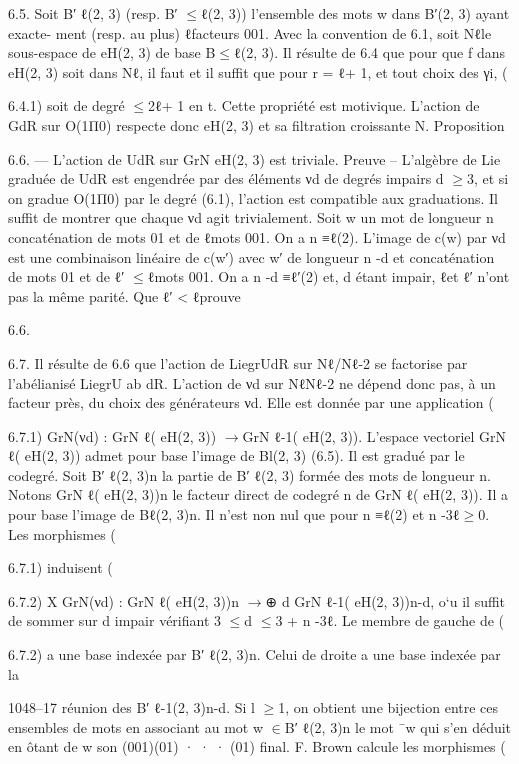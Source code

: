 \documentclass[11pt]{article}
\begin{document}
6.5. Soit B′ ℓ(2, 3) (resp. B′ \(\le\)ℓ(2, 3)) l’ensemble des mots w dans B′(2, 3) ayant exacte- ment (resp. au plus) ℓfacteurs 001. Avec la convention de 6.1, soit Nℓle sous-espace de eH(2, 3) de base B\(\le\)ℓ(2, 3). Il résulte de 6.4 que pour que f dans eH(2, 3) soit dans Nℓ, il faut et il suffit que pour r = ℓ+ 1, et tout choix des γi, (

6.4.1) soit de degré \(\le\)2ℓ+ 1 en t. Cette propriété est motivique. L’action de GdR sur O(1Π0) respecte donc eH(2, 3) et sa filtration croissante N. Proposition 

6.6. --- L’action de UdR sur GrN eH(2, 3) est triviale. Preuve -- L’algèbre de Lie graduée de UdR est engendrée par des éléments νd de degrés impairs d \(\ge\)3, et si on gradue O(1Π0) par le degré (6.1), l’action est compatible aux graduations. Il suffit de montrer que chaque νd agit trivialement. Soit w un mot de longueur n concaténation de mots 01 et de ℓmots 001. On a n ≡ℓ(2). L’image de c(w) par νd est une combinaison linéaire de c(w′) avec w′ de longueur n -d et concaténation de mots 01 et de ℓ′ \(\le\)ℓmots 001. On a n -d ≡ℓ′(2) et, d étant impair, ℓet ℓ′ n’ont pas la même parité. Que ℓ′ < ℓprouve 

6.6. 

6.7. Il résulte de 6.6 que l’action de LiegrUdR sur Nℓ/Nℓ-2 se factorise par l’abélianisé LiegrU ab dR. L’action de νd sur NℓNℓ-2 ne dépend donc pas, à un facteur près, du choix des générateurs νd. Elle est donnée par une application (

6.7.1) GrN(νd) : GrN ℓ( eH(2, 3)) \(\to\)GrN ℓ-1( eH(2, 3)). L’espace vectoriel GrN ℓ( eH(2, 3)) admet pour base l’image de Bl(2, 3) (6.5). Il est gradué par le codegré. Soit B′ ℓ(2, 3)n la partie de B′ ℓ(2, 3) formée des mots de longueur n. Notons GrN ℓ( eH(2, 3))n le facteur direct de codegré n de GrN ℓ( eH(2, 3)). Il a pour base l’image de Bℓ(2, 3)n. Il n’est non nul que pour n ≡ℓ(2) et n -3ℓ\(\ge\)0. Les morphismes (

6.7.1) induisent (

6.7.2) X GrN(νd) : GrN ℓ( eH(2, 3))n \(\to\)⊕ d GrN ℓ-1( eH(2, 3))n-d, o`u il suffit de sommer sur d impair vérifiant 3 \(\le\)d \(\le\)3 + n -3ℓ. Le membre de gauche de (

6.7.2) a une base indexée par B′ ℓ(2, 3)n. Celui de droite a une base indexée par la

1048--17 réunion des B′ ℓ-1(2, 3)n-d. Si l \(\ge\)1, on obtient une bijection entre ces ensembles de mots en associant au mot w \(\in\)B′ ℓ(2, 3)n le mot ¯w qui s’en déduit en ôtant de w son (001)(01) · · · (01) final. F. Brown calcule les morphismes (
\end{document}
